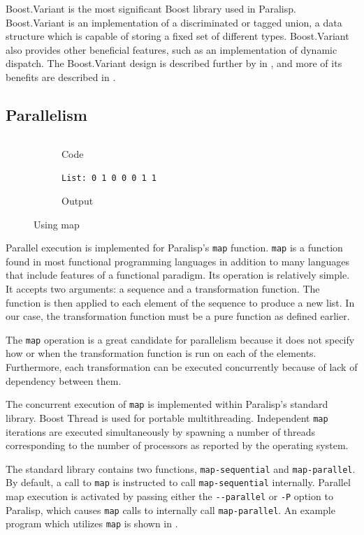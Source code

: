 \documentclass[abstracton]{scrartcl}
\begin{document}
Boost.Variant is the most significant Boost library used in Paralisp. Boost.Variant is an implementation of a discriminated or tagged union, a data structure which is capable of storing a fixed set of different types. Boost.Variant also provides other beneficial features, such as an implementation of dynamic dispatch. The Boost.Variant design is described further by \citeauthor{boost-variant} in , and more of its benefits are described in .

\subsection{Parallelism}

\begin{figure}
  \begin{subfigure}[b]{0.5\textwidth}
    \centering
    \inputminted{scheme}{code/map-is-positive.scm}
    \caption{Code}
  \end{subfigure}
  \begin{subfigure}[b]{0.5\textwidth}
    \centering
    \verb|List: 0 1 0 0 0 1 1|
    \caption{Output}
  \end{subfigure}
  \caption{Using map}\label{fig:map}
\end{figure}

Parallel execution is implemented for Paralisp's \verb|map| function. \verb|map| is a function found in most functional programming languages in addition to many languages that include features of a functional paradigm. Its operation is relatively simple. It accepts two arguments: a sequence and a transformation function. The function is then applied to each element of the sequence to produce a new list. In our case, the transformation function must be a pure function as defined earlier.

The \verb|map| operation is a great candidate for parallelism because it does not specify how or when the transformation function is run on each of the elements. Furthermore, each transformation can be executed concurrently because of lack of dependency between them.

The concurrent execution of \verb|map| is implemented within Paralisp's standard library. Boost Thread is used for portable multithreading. Independent \verb|map| iterations are executed simultaneously by spawning a number of threads corresponding to the number of processors as reported by the operating system.

The standard library contains two functions, \verb|map-sequential| and \verb|map-parallel|. By default, a call to \verb|map| is instructed to call \verb|map-sequential| internally. Parallel map execution is activated by passing either the \verb|--parallel| or \verb|-P| option to Paralisp, which causes \verb|map| calls to internally call \verb|map-parallel|. An example program which utilizes \verb|map| is shown in .
\end{document}
